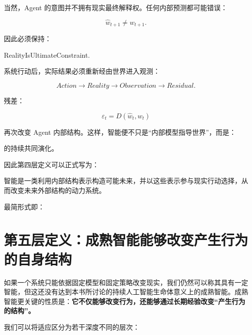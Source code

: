 当然，Agent 的意图并不拥有现实最终解释权。任何内部预测都可能错误：

\[
\hat w_{t+1}
\neq
w_{t+1}.
\]

因此必须保持：

\begin{statementbox}
RealityIsUltimateConstraint.
\end{statementbox}

系统行动后，实际结果必须重新经由世界进入观测：

\[
Action
\rightarrow
Reality
\rightarrow
Observation
\rightarrow
Residual.
\]

残差：

\[
\varepsilon_t
=
D(
\hat w_t,
w_t
)
\]

再次改变 Agent 内部结构。这样，智能便不只是“内部模型指导世界”，而是：

\begin{statementbox}
\centering
{}
\end{statementbox}

的持续共同演化。

因此第四层定义可以正式写为：

\begin{definition*}
智能是一类利用内部结构表示构造可能未来，并以这些表示参与现实行动选择，从而改变未来外部结构的动力系统。
\end{definition*}

最简形式即：

\begin{statementbox}
\centering
{}
\end{statementbox}

\section{第五层定义：成熟智能能够改变产生行为的自身结构}

如果一个系统只能依据固定模型和固定策略改变现实，我们仍然可以称其具有一定智能，但这还没有达到本书所讨论的持续人工智能生命体意义上的成熟智能。成熟智能更关键的性质是：\textbf{它不仅能够改变行为，还能够通过长期经验改变“产生行为的结构”。}

我们可以将适应区分为若干深度不同的层次：

\begin{statementbox}
\centering
{}
\end{statementbox}

